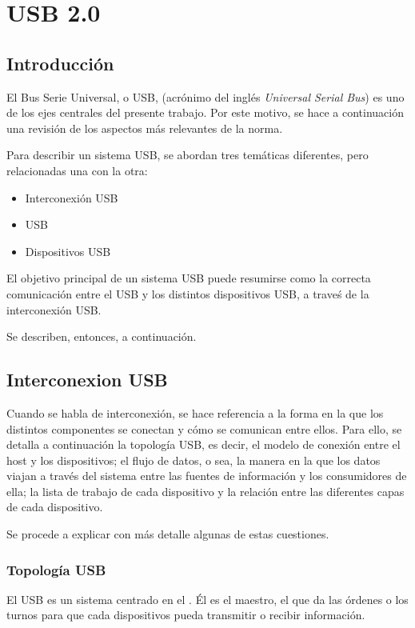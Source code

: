\chapter{USB 2.0}

  \section{Introducción}
  El Bus Serie Universal, o USB, (acrónimo del inglés {\it Universal Serial Bus})
  es uno de los ejes centrales del presente trabajo. Por este motivo, se hace a
  continuación una revisión de los aspectos más relevantes de la norma.

  Para describir un sistema USB, se abordan tres temáticas diferentes, pero
  relacionadas una con la otra:

  \begin{itemize}
    \item Interconexión USB
    \item \host USB
    \item Dispositivos USB
  \end{itemize}

  El objetivo principal de un sistema USB puede resumirse como la correcta
  comunicación entre el \host USB y los distintos dispositivos USB, a traveś de
  la interconexión USB.

  Se describen, entonces, a continuación.

  \section{Interconexion USB}
  Cuando se habla de interconexión, se hace referencia a la forma en la que los
  distintos componentes se conectan y cómo se comunican entre ellos. Para ello,
  se detalla a continuación la topología USB, es decir, el modelo de conexión
  entre el host y los dispositivos; el flujo de datos, o sea, la manera en la
  que los datos viajan a través del sistema entre las fuentes de información y
  los consumidores de ella; la lista de trabajo de cada dispositivo y la
  relación entre las diferentes capas de cada dispositivo.

  Se procede a explicar con más detalle algunas de estas cuestiones.

    \subsection{Topología USB}
    El USB es un sistema centrado en el \host. Él es el maestro, el que da las
    órdenes o los turnos para que cada dispositivos pueda transmitir o recibir
    información.

